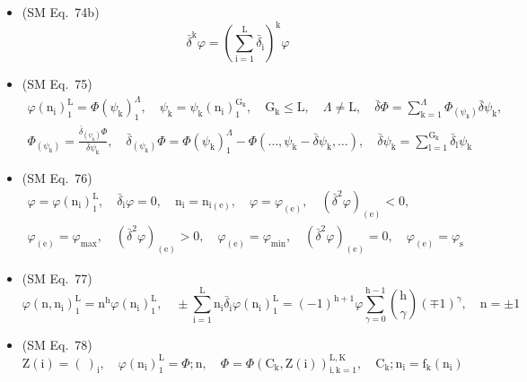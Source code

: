 \documentclass[
    12pt,              %
    a4paper,           %
    headings=normal,   %
    twoside=true,      %
    BCOR=8mm,          %
]{scrbook}
\begin{document}
\begin{itemize}[label={},leftmargin=0pt]
    \item (SM Eq.\ 74b) 
    \[
    \bar{\delta}^\mathrm{k} \varphi = \left( \sum_{\mathrm{i}=1}^\mathrm{L} \bar{\delta}_\mathrm{i} \right)^\mathrm{k} \varphi
    \]

    \item (SM Eq.\ 75) 
    \[
    \begin{gathered}
    \varphi(\mathrm{n_i})_1^\mathrm{L} = \Phi(\psi_\mathrm{k})_1^\Lambda, \quad \psi_\mathrm{k} = \psi_\mathrm{k}(\mathrm{n_i})_1^{\mathrm{G_k}}, \quad \mathrm{G_k} \le \mathrm{L}, \quad \Lambda \ne \mathrm{L}, \quad \bar{\delta}\Phi = \sum_{\mathrm{k}=1}^\Lambda \Phi_{(\psi_\mathrm{k})} \bar{\delta}\psi_\mathrm{k}, \\
    \Phi_{(\psi_\mathrm{k})} = \frac{\bar{\delta}_{(\psi_\mathrm{k})}\Phi}{\bar{\delta}\psi_\mathrm{k}}, \quad \bar{\delta}_{(\psi_\mathrm{k})}\Phi = \Phi(\psi_\mathrm{k})_1^\Lambda - \Phi(\dots, \psi_\mathrm{k} - \bar{\delta}\psi_\mathrm{k}, \dots), \quad \bar{\delta}\psi_\mathrm{k} = \sum_{\mathrm{l}=1}^{\mathrm{G_k}} \bar{\delta}_\mathrm{l} \psi_\mathrm{k}
    \end{gathered}
    \]

    \item (SM Eq.\ 76) 
    \[
    \begin{gathered}
    \varphi = \varphi(\mathrm{n_i})_1^\mathrm{L}, \quad \bar{\delta}_\mathrm{i} \varphi = 0, \quad \mathrm{n_i} = \mathrm{n}_{\mathrm{i(e)}}, \quad \varphi = \varphi_{\mathrm{(e)}}, \quad (\bar{\delta}^2\varphi)_{\mathrm{(e)}} < 0, \\
    \varphi_{\mathrm{(e)}} = \varphi_{\max}, \quad (\bar{\delta}^2\varphi)_{\mathrm{(e)}} > 0, \quad \varphi_{\mathrm{(e)}} = \varphi_{\min}, \quad (\bar{\delta}^2\varphi)_{\mathrm{(e)}} = 0, \quad \varphi_{\mathrm{(e)}} = \varphi_\mathrm{s}
    \end{gathered}
    \]

    \item (SM Eq.\ 77) 
    \[
    \varphi(\mathrm{n}, \mathrm{n_i})_1^\mathrm{L} = \mathrm{n^h} \varphi(\mathrm{n_i})_1^\mathrm{L}, \quad \pm\sum_{\mathrm{i}=1}^\mathrm{L} \mathrm{n_i} \bar{\delta}_\mathrm{i} \varphi(\mathrm{n_i})_1^\mathrm{L} = (-1)^{\mathrm{h}+1} \varphi \sum_{\gamma=0}^{\mathrm{h}-1} \binom{\mathrm{h}}{\gamma} (\mp 1)^\gamma, \quad \mathrm{n} = \pm 1
    \]

    \item (SM Eq.\ 78) 
    \[
    \mathrm{Z}(\mathrm{i}) = (\ )_\mathrm{i}, \quad \varphi(\mathrm{n_i})_1^\mathrm{L} = \Phi;\mathrm{n}, \quad \Phi = \Phi(\mathrm{C_k}, \mathrm{Z}(\mathrm{i}))_{\mathrm{i,k}=1}^{\mathrm{L,K}}, \quad \mathrm{C_k};\mathrm{n_i} = \mathrm{f_k}(\mathrm{n_i})
    \]


\end{itemize}
\end{document}

